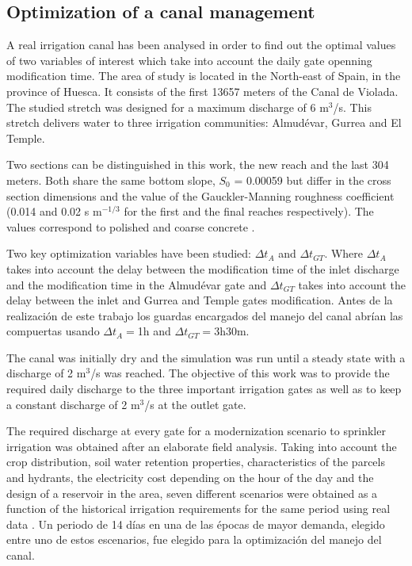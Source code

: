 \documentclass[review,authoryear]{elsarticle}
\begin{document}
\subsection{Optimization of a canal management}

A real irrigation canal has been analysed in order to find out the optimal
values of two variables of interest which take into account the daily gate openning
modification time. The area of study is located in the North-east of Spain, in the
province of Huesca. It consists of the first 13657 meters of the Canal de
Violada. The studied stretch was designed for a maximum discharge of 6 m$^3$/s.
This stretch delivers water to three irrigation communities: Almudévar, Gurrea
and El Temple. 

Two sections can be distinguished in this work, the new reach and the last 304
meters. Both share the same bottom slope, $S_0$ = 0.00059 but differ in the
cross section dimensions and the value of the Gauckler-Manning roughness
coefficient (0.014 and 0.02 s m$^{-1/3}$ for the first
and the final reaches respectively). The values correspond to polished and
coarse concrete \citep{Chow59}.

Two key optimization variables have been studied: $\Delta t_A$ and
$\Delta t_{GT}$. Where $\Delta t_A$ takes into account the delay between the
modification time of the inlet discharge and the modification time in the
Almudévar gate and $\Delta t_{GT}$ takes into account the delay between the
inlet and Gurrea and Temple gates modification. Antes de la realización de este
trabajo los guardas encargados del manejo del canal abrían las compuertas usando
$\Delta t_A=$1h and $\Delta t_{GT}=$3h30m.

The canal was initially dry and the simulation was run until a steady state with
a discharge of 2 m$^3$/s was reached. The objective of this work was to provide
the required daily discharge to the three important irrigation gates as well as
to keep a constant discharge of 2 m$^3$/s at the outlet gate. 

The required discharge at every gate for a modernization scenario to sprinkler irrigation was obtained after an elaborate 
field analysis. Taking into account the crop distribution, soil water retention properties, 
characteristics of the parcels and hydrants, the electricity cost depending on the hour of the day and the design of a 
reservoir in the area, seven different scenarios were obtained as a function of the historical irrigation requirements for 
the same period using real data \citet{Zapata09}. Un periodo de 14 días en una
de las épocas de mayor demanda, elegido entre uno de estos escenarios, fue
elegido para la optimización del manejo del canal.
\end{document}
